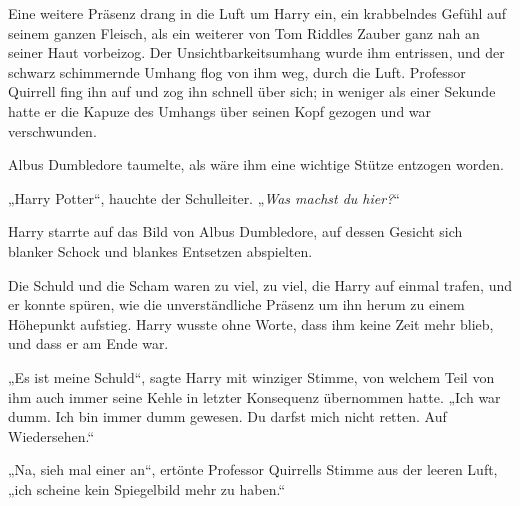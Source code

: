 Eine weitere Präsenz drang in die Luft um Harry ein, ein krabbelndes Gefühl auf seinem ganzen Fleisch, als ein weiterer von Tom Riddles Zauber ganz nah an seiner Haut vorbeizog. Der Unsichtbarkeitsumhang wurde ihm entrissen, und der schwarz schimmernde Umhang flog von ihm weg, durch die Luft.
Professor Quirrell fing ihn auf und zog ihn schnell über sich; in weniger als einer Sekunde hatte er die Kapuze des Umhangs über seinen Kopf gezogen und war verschwunden.

Albus Dumbledore taumelte, als wäre ihm eine wichtige Stütze entzogen worden.

„Harry Potter“, hauchte der Schulleiter. „\emph{Was machst du hier?}“

Harry starrte auf das Bild von Albus Dumbledore, auf dessen Gesicht sich blanker Schock und blankes Entsetzen abspielten.

Die Schuld und die Scham waren zu viel, zu viel, die Harry auf einmal trafen, und er konnte spüren, wie die unverständliche Präsenz um ihn herum zu einem Höhepunkt aufstieg. Harry wusste ohne Worte, dass ihm keine Zeit mehr blieb, und dass er am Ende war.

„Es ist meine Schuld“, sagte Harry mit winziger Stimme, von welchem Teil von ihm auch immer seine Kehle in letzter Konsequenz übernommen hatte. „Ich war dumm. Ich bin immer dumm gewesen. Du darfst mich nicht retten. Auf Wiedersehen.“

„Na, sieh mal einer an“, ertönte Professor Quirrells Stimme aus der leeren Luft, „ich scheine kein Spiegelbild mehr zu haben.“

